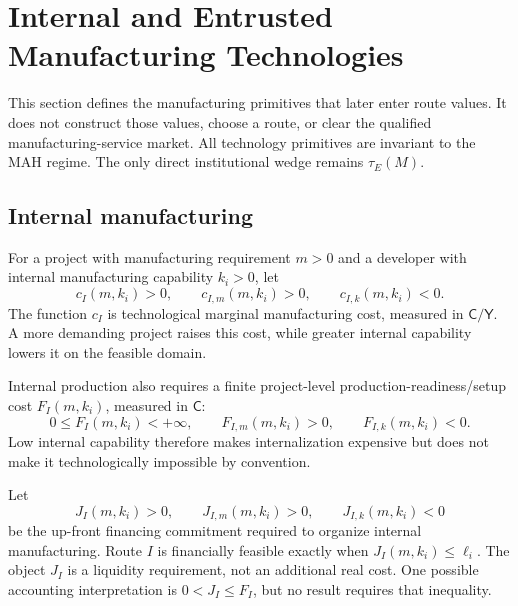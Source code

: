\section{Internal and Entrusted Manufacturing Technologies}
\label{sec:p03-technologies}

This section defines the manufacturing primitives that later enter route
values. It does not construct those values, choose a route, or clear the
qualified manufacturing-service market. All technology primitives are
invariant to the MAH regime. The only direct institutional wedge remains
\(\tau_E(M)\).

\subsection{Internal manufacturing}
\label{subsec:p03-internal}

For a project with manufacturing requirement \(m>0\) and a developer with
internal manufacturing capability \(k_i>0\), let
\begin{equation}
  c_I(m,k_i)>0,
  \qquad
  c_{I,m}(m,k_i)>0,
  \qquad
  c_{I,k}(m,k_i)<0
  .
  \label{eq:p03-internal-cost}
\end{equation}
The function \(c_I\) is technological marginal manufacturing cost, measured
in \(\mathsf C/\mathsf Y\). A more demanding project raises this cost, while
greater internal capability lowers it on the feasible domain.

Internal production also requires a finite project-level
production-readiness/setup cost \(F_I(m,k_i)\), measured in \(\mathsf C\):
\begin{equation}
  0\leq F_I(m,k_i)<+\infty,
  \qquad
  F_{I,m}(m,k_i)>0,
  \qquad
  F_{I,k}(m,k_i)<0.
  \label{eq:p03-internal-setup}
\end{equation}
Low internal capability therefore makes internalization expensive but does
not make it technologically impossible by convention.

Let
\begin{equation}
  J_I(m,k_i)>0,
  \qquad
  J_{I,m}(m,k_i)>0,
  \qquad
  J_{I,k}(m,k_i)<0
  \label{eq:p03-internal-financing}
\end{equation}
be the up-front financing commitment required to organize internal
manufacturing. Route \(I\) is financially feasible exactly when
\(J_I(m,k_i)\leq\ell_i\). The object \(J_I\) is a liquidity requirement,
not an additional real cost. One possible accounting interpretation is
\(0<J_I\leq F_I\), but no result requires that inequality.

